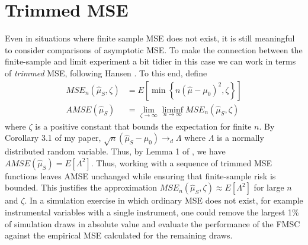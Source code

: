 \section{Trimmed MSE}
\label{append:trim}
    Even in situations where finite sample MSE does not exist, it is still meaningful to consider comparisons of asymptotic MSE.
    To make the connection between the finite-sample and limit experiment a bit tidier in this case we can work in terms of \emph{trimmed} MSE,  following Hansen \cite{HansenShrink}. 
    To this end, define
    \begin{align*}
      MSE_n(\widehat{\mu}_S, \zeta) &= E\left[ \min\left\{ n(\widehat{\mu} - \mu_0)^2, \zeta  \right\} \right]\\
      AMSE(\widehat{\mu}_S) &= \lim_{\zeta \rightarrow \infty} \liminf_{n\rightarrow \infty} MSE_n(\widehat{\mu}_S, \zeta)
    \end{align*}
    where $\zeta$ is a positive constant that bounds the expectation for finite $n$.
    By Corollary 3.1 of my paper, $\sqrt{n}(\widehat{\mu}_S-\mu_0) \rightarrow_d \Lambda$ where $\Lambda$ is a normally distributed random variable.
    Thus, by Lemma 1 of \cite{HansenShrink}, we have $AMSE(\widehat{\mu}_S) = E[\Lambda^2]$.
    Thus, working with a sequence of trimmed MSE functions leaves AMSE unchanged while ensuring that finite-sample risk is bounded.
    This justifies the approximation $MSE_n(\widehat{\mu}_S, \zeta) \approx E[\Lambda^2]$ for large $n$ and $\zeta$.
    In a simulation exercise in which ordinary MSE does not exist, for example instrumental variables with a single instrument, one could remove the largest 1\% of simulation draws in absolute value and evaluate the performance of the FMSC against the empirical MSE calculated for the remaining draws.

